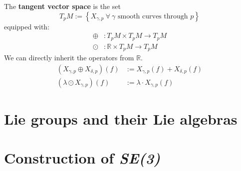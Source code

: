 \documentclass[root.tex]{subfiles}
\begin{document}
\begin{mydef}
  The \textbf{tangent vector space} is the set
  $$
  T_pM:=\left\{ X_{\gamma, p}\ \forall\ \gamma \text{ smooth curves through } p\right\}
  $$
  equipped with:
  $$
  \begin{aligned}
    \oplus &: T_pM \times T_pM \to T_pM\\
    \odot  &: \mathbb{R} \times T_pM \to T_pM
  \end{aligned}
  $$
  We can directly inherit the operators from $\mathbb{R}$.
  $$
  \begin{aligned}
    (X_{\gamma,p} \oplus X_{\delta,p})(f) &:= X_{\gamma, p}(f) + X_{\delta, p}(f)\\
    (\lambda \odot X_{\gamma,p})(f) &:= \lambda \cdot X_{\gamma, p}(f)
  \end{aligned}
  $$
\end{mydef}


\chapter{Lie groups and their Lie algebras}%


\chapter{Construction of \emph{SE(3)}}%


\end{document}
